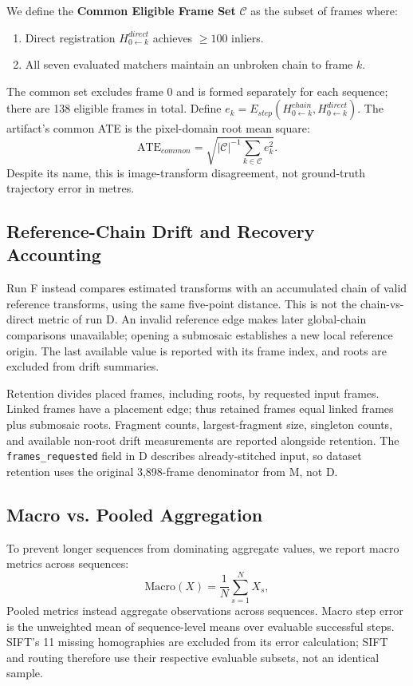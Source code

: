 \documentclass[conference]{IEEEtran}
\begin{document}
We define the \textbf{Common Eligible Frame Set} $\mathcal{C}$ as the subset of frames where:
\begin{enumerate}
    \item Direct registration $H_{0 \leftarrow k}^{direct}$ achieves $\ge 100$ inliers.
    \item All seven evaluated matchers maintain an unbroken chain to frame $k$.
\end{enumerate}
The common set excludes frame 0 and is formed separately for each sequence; there are 138 eligible frames in total. Define $e_k=E_{step}(H_{0\leftarrow k}^{chain},H_{0\leftarrow k}^{direct})$. The artifact's common ATE is the pixel-domain root mean square:
\begin{equation}
\text{ATE}_{common}=\sqrt{|\mathcal{C}|^{-1}\sum_{k\in\mathcal{C}}e_k^2}.
\label{eq:common_ate}
\end{equation}
Despite its name, this is image-transform disagreement, not ground-truth trajectory error in metres.

\subsection{Reference-Chain Drift and Recovery Accounting}
Run F instead compares estimated transforms with an accumulated chain of valid reference transforms, using the same five-point distance. This is not the chain-vs-direct metric of run D. An invalid reference edge makes later global-chain comparisons unavailable; opening a submosaic establishes a new local reference origin. The last available value is reported with its frame index, and roots are excluded from drift summaries.

Retention divides placed frames, including roots, by requested input frames. Linked frames have a placement edge; thus retained frames equal linked frames plus submosaic roots. Fragment counts, largest-fragment size, singleton counts, and available non-root drift measurements are reported alongside retention. The \texttt{frames\_requested} field in D describes already-stitched input, so dataset retention uses the original 3,898-frame denominator from M, not D.

\subsection{Macro vs. Pooled Aggregation}
\label{subsec:metric_aggregation}

To prevent longer sequences from dominating aggregate values, we report macro metrics across sequences:
\begin{equation}
\text{Macro}(X) = \frac{1}{N} \sum_{s=1}^N X_s,
\label{eq:macro_mean}
\end{equation}
Pooled metrics instead aggregate observations across sequences. Macro step error is the unweighted mean of sequence-level means over evaluable successful steps. SIFT's 11 missing homographies are excluded from its error calculation; SIFT and routing therefore use their respective evaluable subsets, not an identical sample.
\end{document}
